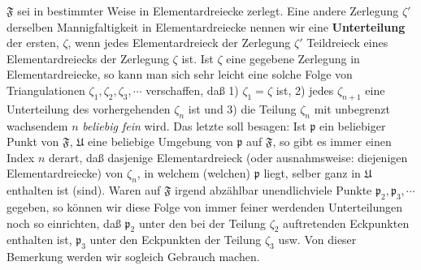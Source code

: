 \documentclass{article}
\begin{document}
$\mathfrak{F}$ sei in bestimmter Weise in Elementardreiecke zerlegt. Eine andere Zerlegung $\zeta'$ derselben Mannigfaltigkeit in Elementardreiecke nennen wir eine \textbf{Unterteilung} der ersten, $\zeta$, wenn jedes Elementardreieck der Zerlegung $\zeta'$ Teildreieck eines Elementardreiecks der Zerlegung $\zeta$ ist. Ist $\zeta$ eine gegebene Zerlegung in Elementardreiecke, so kann man sich sehr leicht eine solche Folge von Triangulationen $\zeta_1, \zeta_2, \zeta_3, \cdots$ verschaffen, daß 1) $\zeta_1 = \zeta$ ist, 2) jedes $\zeta_{n+1}$ eine Unterteilung des vorhergehenden $\zeta_n$ ist und 3) die Teilung $\zeta_n$ mit unbegrenzt wachsendem $n$ \emph{beliebig fein} wird. Das letzte soll besagen: Ist $\mathfrak{p}$ ein beliebiger Punkt von $\mathfrak{F}$, $\mathfrak{U}$ eine beliebige Umgebung von $\mathfrak{p}$ auf $\mathfrak{F}$, so gibt es immer einen Index $n$ derart, daß dasjenige Elementardreieck (oder ausnahmsweise: diejenigen Elementardreiecke) von $\zeta_n$, in welchem (welchen) $\mathfrak{p}$ liegt, selber ganz in $\mathfrak{U}$ enthalten ist (sind). Waren auf $\mathfrak{F}$ irgend abzählbar unendlichviele Punkte $\mathfrak{p}_2, \mathfrak{p}_3, \cdots$ gegeben, so können wir diese Folge von immer feiner werdenden Unterteilungen noch so einrichten, daß $\mathfrak{p}_2$ unter den bei der Teilung $\zeta_2$ auftretenden Eckpunkten enthalten ist, $\mathfrak{p}_3$ unter den Eckpunkten der Teilung $\zeta_3$ usw. Von dieser Bemerkung werden wir sogleich Gebrauch machen.
\end{document}
